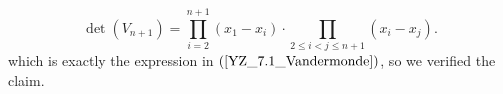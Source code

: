 \documentclass{ximera}
\begin{document}
\begin{exercise}
\begin{solution}
\[
\det(V_{n+1})=\prod_{i=2}^{n+1}(x_1-x_i)\cdot \prod_{2\le i<j\le n+1}(x_i-x_j).
\]
which is exactly the expression in $(\ref{YZ_7.1_Vandermonde})$, so we verified the claim.
\end{solution}
\end{exercise}
\end{document}
